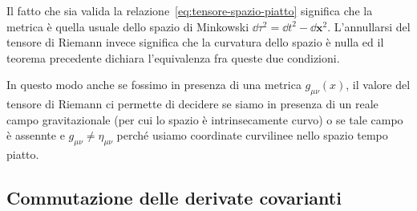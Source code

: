 Il fatto che sia valida la relazione~\eqref{eq:tensore-spazio-piatto} significa
che la metrica è quella usuale dello spazio di Minkowski $\dd \tau^{2} = \dd
t^{2} - \dd\bm{x}^{2}$.  L'annullarsi del tensore di Riemann invece significa
che la curvatura dello spazio è nulla ed il teorema precedente dichiara
l'equivalenza fra queste due condizioni.

In questo modo anche se fossimo in presenza di una metrica $g_{\mu \nu}(x)$, il
valore del tensore di Riemann ci permette di decidere se siamo in presenza di un
reale campo gravitazionale (per cui lo spazio è intrinsecamente curvo) o se tale
campo è assennte e $g_{\mu \nu} \ne \eta_{\mu \nu}$ perché usiamo coordinate
curvilinee nello spazio tempo piatto.

\subsection{Commutazione delle derivate covarianti}
\label{sec:commutazione-derivate-covarianti}


